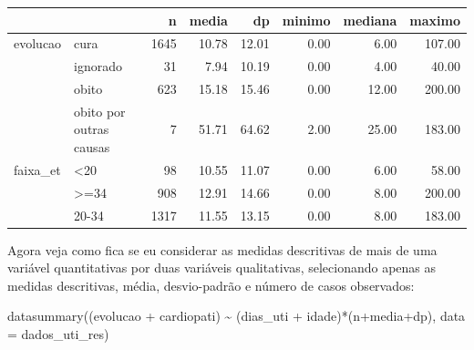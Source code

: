 \documentclass[
  letterpaper,
  DIV=11,
  numbers=noendperiod]{scrreprt}
\newenvironment{Shaded}{\begin{snugshade}}{\end{snugshade}}
\newcommand{\AttributeTok}[1]{\textcolor[rgb]{0.40,0.45,0.13}{#1}}
\newcommand{\FunctionTok}[1]{\textcolor[rgb]{0.28,0.35,0.67}{#1}}
\newcommand{\NormalTok}[1]{\textcolor[rgb]{0.00,0.23,0.31}{#1}}
\newcommand{\SpecialCharTok}[1]{\textcolor[rgb]{0.37,0.37,0.37}{#1}}
\begin{document}
\begin{table}
\centering
\begin{tabular}[t]{llrrrrrr}
\toprule
  &    & n & media & dp & minimo & mediana & maximo\\
\midrule
evolucao & cura & \num{1645} & \num{10.78} & \num{12.01} & \num{0.00} & \num{6.00} & \num{107.00}\\
 & ignorado & \num{31} & \num{7.94} & \num{10.19} & \num{0.00} & \num{4.00} & \num{40.00}\\
 & obito & \num{623} & \num{15.18} & \num{15.46} & \num{0.00} & \num{12.00} & \num{200.00}\\
 & obito por outras causas & \num{7} & \num{51.71} & \num{64.62} & \num{2.00} & \num{25.00} & \num{183.00}\\
faixa\_et & <20 & \num{98} & \num{10.55} & \num{11.07} & \num{0.00} & \num{6.00} & \num{58.00}\\
 & >=34 & \num{908} & \num{12.91} & \num{14.66} & \num{0.00} & \num{8.00} & \num{200.00}\\
 & 20-34 & \num{1317} & \num{11.55} & \num{13.15} & \num{0.00} & \num{8.00} & \num{183.00}\\
\bottomrule
\end{tabular}
\end{table}

Agora veja como fica se eu considerar as medidas descritivas de mais de
uma variável quantitativas por duas variáveis qualitativas, selecionando
apenas as medidas descritivas, média, desvio-padrão e número de casos
observados:

\begin{Shaded}
\begin{Highlighting}[]
\FunctionTok{datasummary}\NormalTok{((evolucao }\SpecialCharTok{+}\NormalTok{ cardiopati)  }\SpecialCharTok{\textasciitilde{}}
\NormalTok{              (dias\_uti }\SpecialCharTok{+}\NormalTok{ idade)}\SpecialCharTok{*}\NormalTok{(n}\SpecialCharTok{+}\NormalTok{media}\SpecialCharTok{+}\NormalTok{dp), }\AttributeTok{data =}\NormalTok{ dados\_uti\_res)}
\end{Highlighting}
\end{Shaded}
\end{document}
